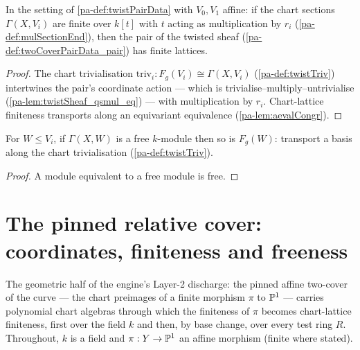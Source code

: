 \begin{theorem}
  \label{pa-thm:moduleFinite_aeval_twistPair}
  \leanok

  In the setting of \ref{pa-def:twistPairData} with \(V_0, V_1\) affine: if the chart
  sections \(\Gamma(X, V_i)\) are finite over \(k[t]\) with \(t\) acting as
  multiplication by \(r_i\) (\ref{pa-def:mulSectionEnd}), then the pair of the twisted
  sheaf (\ref{pa-def:twoCoverPairData_pair}) has finite lattices.
\end{theorem}
\begin{proof}
  \leanok
  The chart trivialisation \(\mathrm{triv}_i : F_g(V_i) \cong \Gamma(X, V_i)\)
  (\ref{pa-def:twistTriv}) intertwines the pair's coordinate action --- which is
  trivialise--multiply--untrivialise (\ref{pa-lem:twistSheaf_qsmul_eq}) --- with
  multiplication by \(r_i\). Chart-lattice finiteness transports along an equivariant
  equivalence (\ref{pa-lem:aevalCongr}).
\end{proof}

\begin{theorem}
  \label{pa-thm:free_twistSheafSections}
  \leanok

  For \(W \le V_i\), if \(\Gamma(X, W)\) is a free \(k\)-module then so is
  \(F_g(W)\): transport a basis along the chart trivialisation
  (\ref{pa-def:twistTriv}).
\end{theorem}
\begin{proof}
  \leanok
  A module equivalent to a free module is free.
\end{proof}

\section{The pinned relative cover: coordinates, finiteness and freeness}
\label{pa-sec:relative_cover_coordinates}

The geometric half of the engine's Layer-2 discharge: the pinned affine two-cover of the
curve --- the chart preimages of a finite morphism \(\pi\) to \(\mathbb{P}^1\) --- carries
polynomial chart algebras through which the finiteness of \(\pi\) becomes chart-lattice
finiteness, first over the field \(k\) and then, by base change, over every test ring
\(R\). Throughout, \(k\) is a field and \(\pi : Y \to \mathbb{P}^1\) an affine morphism (finite
where stated).

